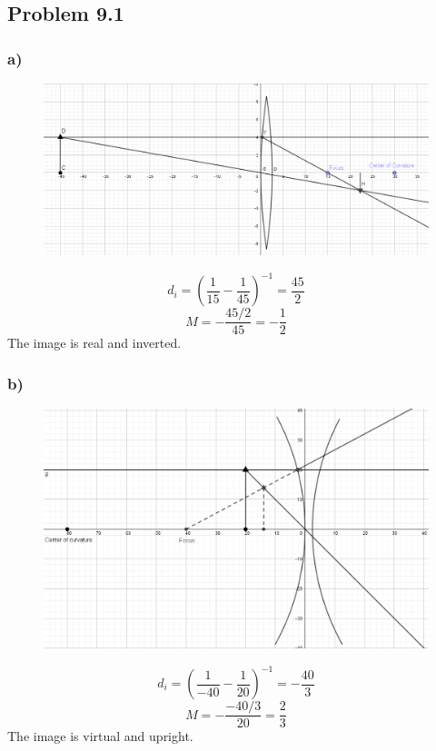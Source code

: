 \documentclass[../homework.tex]{subfiles}
\begin{document}
\subsection{Problem 9.1}
\subsubsection*{a)}
\begin{figure}[H]
    \centering
    \includegraphics[width=\columnwidth]{p1-a.png}
\end{figure}
\begin{equation*}
    d_i = \left(\frac{1}{15} - \frac{1}{45}\right)^{-1} = \frac{45}{2}
\end{equation*}
\begin{equation*}
    M = -\frac{45/2}{45} = -\frac{1}{2} 
\end{equation*}
The image is real and inverted.

\subsubsection*{b)}
\begin{figure}[H]
    \centering
    \includegraphics[width=\columnwidth]{p1-b.png}
\end{figure}
\begin{equation*}
    d_i = \left(\frac{1}{-40} - \frac{1}{20}\right)^{-1} = -\frac{40}{3}
\end{equation*}
\begin{equation*}
    M = -\frac{-40/3}{20} = \frac{2}{3} 
\end{equation*}
The image is virtual and upright.
\end{document}
